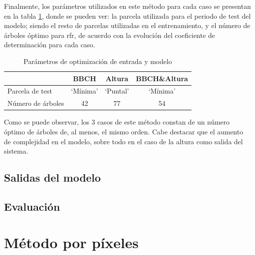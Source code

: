 \par Finalmente, los parámetros utilizados en este método para cada caso se presentan en la tabla \ref{tab:opt_parcl}, donde se pueden ver: la parcela utilizada para el periodo de test del modelo; siendo el resto de parcelas utilizadas en el entrenamiento, y el número de árboles óptimo para \gls{rfr}, de acuerdo con la evolución del coeficiente de determinación para cada caso.

\begin{table}[h]
\centering
\begin{tabular}{l|ccc}
                  & BBCH     & Altura   & BBCH\&Altura \\ \hline
Parcela de test   & `Mínima' & `Puntal' & `Mínima'     \\
Número de árboles & 42       & 77       & 54          
\end{tabular}
\caption{Parámetros de optimización de entrada y modelo
\label{tab:opt_parcl}}
\end{table}

\par Como se puede observar, los 3 casos de este método constan de un número óptimo de árboles de, al menos, el mismo orden. Cabe destacar que el aumento de complejidad en el modelo, sobre todo en el caso de la altura como salida del sistema.  
\subsection{Salidas del modelo}
\subsection{Evaluación}
\section{Método por píxeles} 
